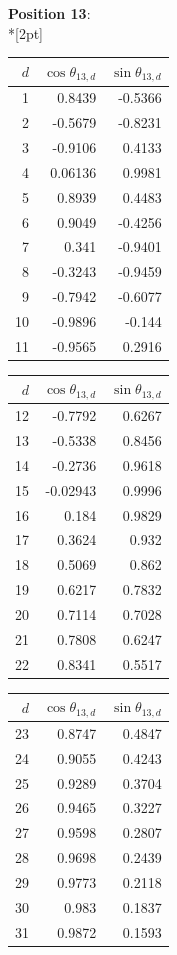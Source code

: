 \noindent \textbf{Position 13}:\\*[2pt]
{\tablefont \begin{tabular}[t]{r|rr}
$d$ & $\cos\theta_{13,d}$ & $\sin\theta_{13,d}$ \\\hline
1 & 0.8439 & -0.5366 \\
2 & -0.5679 & -0.8231 \\
3 & -0.9106 & 0.4133 \\
4 & 0.06136 & 0.9981 \\
5 & 0.8939 & 0.4483 \\
6 & 0.9049 & -0.4256 \\
7 & 0.341 & -0.9401 \\
8 & -0.3243 & -0.9459 \\
9 & -0.7942 & -0.6077 \\
10 & -0.9896 & -0.144 \\
11 & -0.9565 & 0.2916
\end{tabular}\kern4pt
\begin{tabular}[t]{r|rr}
$d$ & $\cos\theta_{13,d}$ & $\sin\theta_{13,d}$ \\\hline
12 & -0.7792 & 0.6267 \\
13 & -0.5338 & 0.8456 \\
14 & -0.2736 & 0.9618 \\
15 & -0.02943 & 0.9996 \\
16 & 0.184 & 0.9829 \\
17 & 0.3624 & 0.932 \\
18 & 0.5069 & 0.862 \\
19 & 0.6217 & 0.7832 \\
20 & 0.7114 & 0.7028 \\
21 & 0.7808 & 0.6247 \\
22 & 0.8341 & 0.5517
\end{tabular}\kern4pt
\begin{tabular}[t]{r|rr}
$d$ & $\cos\theta_{13,d}$ & $\sin\theta_{13,d}$ \\\hline
23 & 0.8747 & 0.4847 \\
24 & 0.9055 & 0.4243 \\
25 & 0.9289 & 0.3704 \\
26 & 0.9465 & 0.3227 \\
27 & 0.9598 & 0.2807 \\
28 & 0.9698 & 0.2439 \\
29 & 0.9773 & 0.2118 \\
30 & 0.983 & 0.1837 \\
31 & 0.9872 & 0.1593 \\

\end{tabular}}
